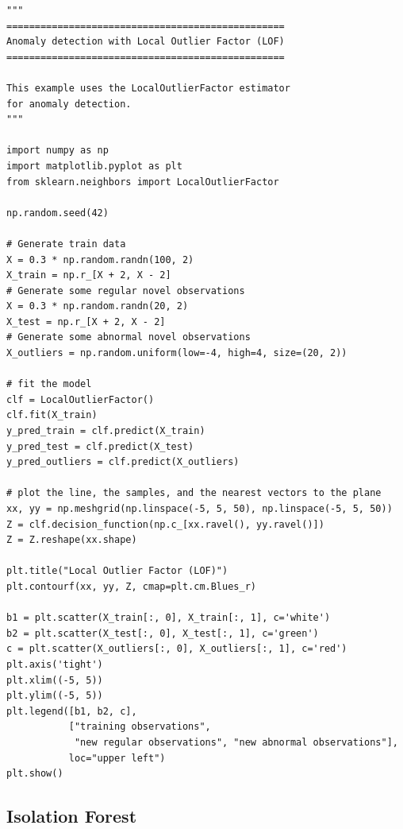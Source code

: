 \begin{mdframed}[hidealllines=true, backgroundcolor=lightgray] 
\begin{verbatim}
"""
=================================================
Anomaly detection with Local Outlier Factor (LOF)
=================================================

This example uses the LocalOutlierFactor estimator
for anomaly detection.
"""

import numpy as np
import matplotlib.pyplot as plt
from sklearn.neighbors import LocalOutlierFactor

np.random.seed(42)

# Generate train data
X = 0.3 * np.random.randn(100, 2)
X_train = np.r_[X + 2, X - 2]
# Generate some regular novel observations
X = 0.3 * np.random.randn(20, 2)
X_test = np.r_[X + 2, X - 2]
# Generate some abnormal novel observations
X_outliers = np.random.uniform(low=-4, high=4, size=(20, 2))

# fit the model
clf = LocalOutlierFactor()
clf.fit(X_train)
y_pred_train = clf.predict(X_train)
y_pred_test = clf.predict(X_test)
y_pred_outliers = clf.predict(X_outliers)

# plot the line, the samples, and the nearest vectors to the plane
xx, yy = np.meshgrid(np.linspace(-5, 5, 50), np.linspace(-5, 5, 50))
Z = clf.decision_function(np.c_[xx.ravel(), yy.ravel()])
Z = Z.reshape(xx.shape)

plt.title("Local Outlier Factor (LOF)")
plt.contourf(xx, yy, Z, cmap=plt.cm.Blues_r)

b1 = plt.scatter(X_train[:, 0], X_train[:, 1], c='white')
b2 = plt.scatter(X_test[:, 0], X_test[:, 1], c='green')
c = plt.scatter(X_outliers[:, 0], X_outliers[:, 1], c='red')
plt.axis('tight')
plt.xlim((-5, 5))
plt.ylim((-5, 5))
plt.legend([b1, b2, c],
           ["training observations",
            "new regular observations", "new abnormal observations"],
           loc="upper left")
plt.show()
\end{verbatim}
\end{mdframed}




\subsection{Isolation Forest}
\label{sec:iforest}


